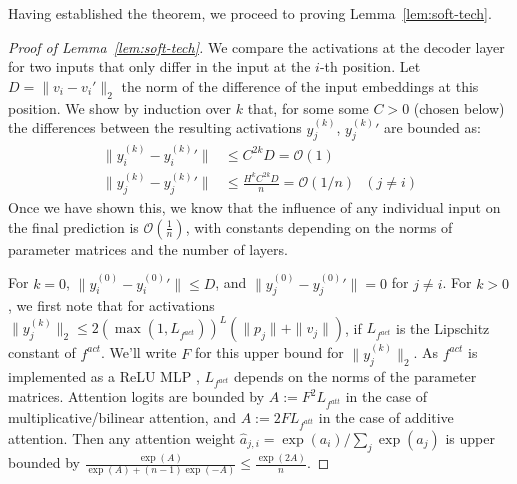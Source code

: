\documentclass[11pt,a4paper]{article}
\newcounter{theorem}
\begin{document}
Having established the theorem, we proceed to proving Lemma~\ref{lem:soft-tech}.
\begin{proof}[Proof of Lemma~\ref{lem:soft-tech}]
We compare the activations at the decoder layer for two inputs that only differ in the input at the $i$-th position.
Let $D = \|v_i-v_i'\|_2$ the norm of the difference of the input embeddings at this position.
	We show by induction over $k$ that, for some some $C > 0$ (chosen below) the differences between the resulting activations $y_j^{(k)}$, ${y_j^{(k)}}'$ are bounded as:
\begin{align*}
	\|y_i^{(k)}-{y_i^{(k)}}'\| &\leq C^{2k}D = \mathcal{O}(1) \\
	\|y_j^{(k)}-{y_j^{(k)}}'\| &\leq \frac{H^k C^{2k}D}{n} = \mathcal{O}(1/n)\ \ \ (j \neq i)
	\end{align*}
Once we have shown this, we know that the influence of any individual input on the final prediction is $\mathcal{O}(\frac{1}{n})$, with constants depending on the norms of parameter matrices and the number of layers.


For $k=0$, $\|y_i^{(0)} - {y_i^{(0)}}'\| \leq D$, %
and %
$\|y_j^{(0)} - {y_j^{(0)}}'\| = 0$ for $j \neq i$.
For $k>0$, we first note that for activations $\|y_j^{(k)}\|_2 \leq 2 \left(\operatorname{max}(1,L_{f^{act}})\right)^{L}  (\|p_j\| + \|v_j\|)$,
if $L_{f^{act}}$ is the Lipschitz constant of $f^{act}$.
We'll write $F$ for this upper bound for $\|y_j^{(k)}\|_2$.
As $f^{act}$ is implemented as a ReLU MLP \cite{vaswani2017attention}, $L_{f^{act}}$ depends on the norms of the parameter matrices.
Attention logits are bounded by $A := F^2 L_{f^{att}}$ in the case of multiplicative/bilinear attention, and $A := 2 F L_{f^{att}}$ in the case of additive attention.
Then any attention weight $\widehat{a}_{j,i} = \exp(a_i)/\sum_j \exp(a_j)$ is upper bounded by $\frac{\exp(A)}{\exp(A) + (n-1) \exp(-A)} \leq \frac{\exp(2A)}{n}$.


\end{proof}
\end{document}
